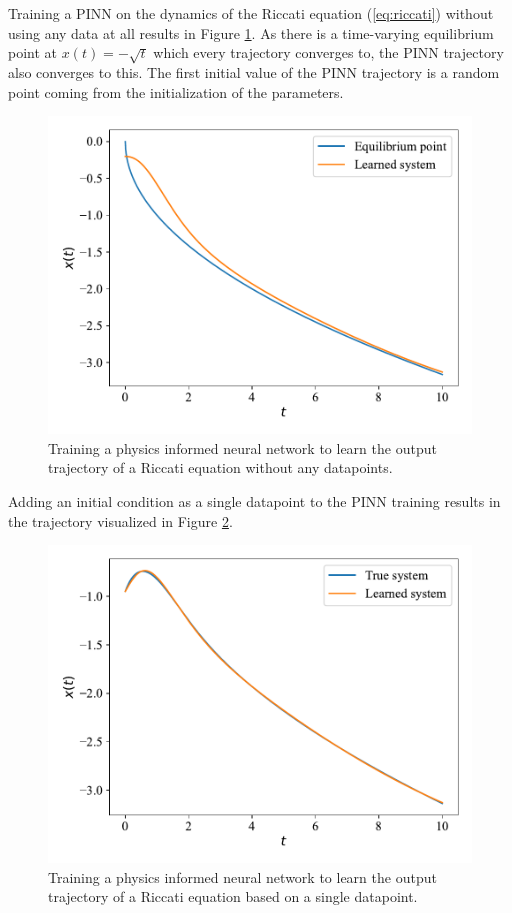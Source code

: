 Training a PINN on the dynamics of the Riccati equation (\ref{eq:riccati}) without using any data at all results in Figure \ref{fig:riccati_physics}. As there is a time-varying equilibrium point at $x(t) = - \sqrt{t}$ which every trajectory converges to, the PINN trajectory also converges to this. The first initial value of the PINN trajectory is a random point coming from the initialization of the parameters.

\begin{figure}[H]
    \centering
    \includegraphics[width=1.0\linewidth]{Figures/InitialExperiments/riccati_physics.pdf}
    \caption{Training a physics informed neural network to learn the output trajectory of a Riccati equation without any datapoints.}
    \label{fig:riccati_physics}
\end{figure}

Adding an initial condition as a single datapoint to the PINN training results in the trajectory visualized in Figure \ref{fig:riccati}.

\begin{figure}[H]
    \centering
    \includegraphics[width=1.0\linewidth]{Figures/InitialExperiments/riccati.pdf}
    \caption{Training a physics informed neural network to learn the output trajectory of a Riccati equation based on a single datapoint.}
    \label{fig:riccati}
\end{figure}

